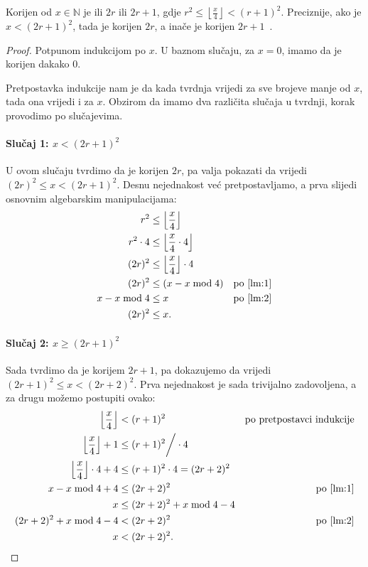 \documentclass[12pt]{scrartcl}
\begin{document}
\begin{teorem}\label{tm:isqrt1}
    Korijen od $x\in\mathbb N$ je ili $2r$ ili $2r+1$, gdje $r^2\leq\left\lfloor\frac{x}{4}\right\rfloor < (r+1)^2$. Preciznije,
    ako je $x < (2r+1)^2$, tada je korijen $2r$, a inače je korijen $2r+1$~\cite{sqrtproof}.
\end{teorem}
\begin{proof}
    Potpunom indukcijom po $x$. U baznom slučaju, za $x=0$, imamo da je korijen dakako $0$.

    Pretpostavka indukcije nam je da kada tvrdnja vrijedi za sve brojeve manje od $x$, tada ona vrijedi i za $x$.
    Obzirom da imamo dva različita slučaja u tvrdnji, korak provodimo po slučajevima.
    \paragraph{Slučaj 1: $x<(2r+1)^2$}
    
    U ovom slučaju tvrdimo da je korijen $2r$, pa valja pokazati da vrijedi $(2r)^2\leq x < (2r+1)^2$. Desnu nejednakost već pretpostavljamo,
    a prva slijedi osnovnim algebarskim manipulacijama:
    \begin{align*}
        r^2 &\leq \left\lfloor\frac{x}{4}\right\rfloor &\\
        r^2\cdot 4 &\leq \left\lfloor\frac{x}{4}\cdot 4\right\rfloor &\\
        (2r)^2 &\leq \left\lfloor\frac{x}{4}\right\rfloor\cdot 4 &\\
        (2r)^2 &\leq (x - x \bmod 4) & \text{po \eqref{lm:1}}\\
        x - x \bmod 4 &\leq x & \text{po \eqref{lm:2}}\\
        (2r)^2 &\leq  x\text.&
    \end{align*}

    \paragraph{Slučaj 2: $x \geq (2r+1)^2$}

    Sada tvrdimo da je korijem $2r+1$, pa dokazujemo da vrijedi $(2r+1)^2 \leq x < (2r+2)^2$. Prva nejednakost je sada trivijalno zadovoljena,
    a za drugu možemo postupiti ovako:
    \begin{align*}
        \left\lfloor\frac{x}{4}\right\rfloor &< (r+1)^2 & \text{po pretpostavci indukcije}\\
        \left\lfloor\frac{x}{4}\right\rfloor + 1 &\leq (r+1)^2 \bigg/\cdot 4 &\\
        \left\lfloor\frac{x}{4}\right\rfloor\cdot 4 + 4 &\leq (r+1)^2\cdot 4 = (2r+2)^2 &\\
        x - x \bmod 4 + 4 &\leq (2r+2)^2 & \text{po \eqref{lm:1}}\\
        x &\leq (2r+2)^2 + x \bmod 4 - 4 &\\
        (2r+2)^2 + x \bmod 4 - 4 &< (2r+2)^2 & \text{po \eqref{lm:2}}\\
        x &< (2r+2)^2\text.&
    \end{align*}
\end{proof}
\end{document}
